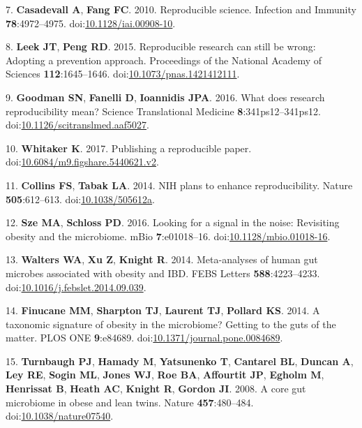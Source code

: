 \documentclass[]{article}
\begin{document}
\hypertarget{ref-Casadevall2010}{}
7. \textbf{Casadevall A}, \textbf{Fang FC}. 2010. Reproducible science.
Infection and Immunity \textbf{78}:4972--4975.
doi:\href{https://doi.org/10.1128/iai.00908-10}{10.1128/iai.00908-10}.

\hypertarget{ref-Leek2015}{}
8. \textbf{Leek JT}, \textbf{Peng RD}. 2015. Reproducible research can
still be wrong: Adopting a prevention approach. Proceedings of the
National Academy of Sciences \textbf{112}:1645--1646.
doi:\href{https://doi.org/10.1073/pnas.1421412111}{10.1073/pnas.1421412111}.

\hypertarget{ref-Goodman2016}{}
9. \textbf{Goodman SN}, \textbf{Fanelli D}, \textbf{Ioannidis JPA}.
2016. What does research reproducibility mean? Science Translational
Medicine \textbf{8}:341ps12--341ps12.
doi:\href{https://doi.org/10.1126/scitranslmed.aaf5027}{10.1126/scitranslmed.aaf5027}.

\hypertarget{ref-Whitaker2017}{}
10. \textbf{Whitaker K}. 2017. Publishing a reproducible paper.
doi:\href{https://doi.org/10.6084/m9.figshare.5440621.v2}{10.6084/m9.figshare.5440621.v2}.

\hypertarget{ref-Collins2014}{}
11. \textbf{Collins FS}, \textbf{Tabak LA}. 2014. NIH plans to enhance
reproducibility. Nature \textbf{505}:612--613.
doi:\href{https://doi.org/10.1038/505612a}{10.1038/505612a}.

\hypertarget{ref-Sze2016}{}
12. \textbf{Sze MA}, \textbf{Schloss PD}. 2016. Looking for a signal in
the noise: Revisiting obesity and the microbiome. mBio
\textbf{7}:e01018--16.
doi:\href{https://doi.org/10.1128/mbio.01018-16}{10.1128/mbio.01018-16}.

\hypertarget{ref-Walters2014}{}
13. \textbf{Walters WA}, \textbf{Xu Z}, \textbf{Knight R}. 2014.
Meta-analyses of human gut microbes associated with obesity and IBD.
FEBS Letters \textbf{588}:4223--4233.
doi:\href{https://doi.org/10.1016/j.febslet.2014.09.039}{10.1016/j.febslet.2014.09.039}.

\hypertarget{ref-Finucane2014}{}
14. \textbf{Finucane MM}, \textbf{Sharpton TJ}, \textbf{Laurent TJ},
\textbf{Pollard KS}. 2014. A taxonomic signature of obesity in the
microbiome? Getting to the guts of the matter. PLOS ONE
\textbf{9}:e84689.
doi:\href{https://doi.org/10.1371/journal.pone.0084689}{10.1371/journal.pone.0084689}.

\hypertarget{ref-Turnbaugh2008}{}
15. \textbf{Turnbaugh PJ}, \textbf{Hamady M}, \textbf{Yatsunenko T},
\textbf{Cantarel BL}, \textbf{Duncan A}, \textbf{Ley RE}, \textbf{Sogin
ML}, \textbf{Jones WJ}, \textbf{Roe BA}, \textbf{Affourtit JP},
\textbf{Egholm M}, \textbf{Henrissat B}, \textbf{Heath AC},
\textbf{Knight R}, \textbf{Gordon JI}. 2008. A core gut microbiome in
obese and lean twins. Nature \textbf{457}:480--484.
doi:\href{https://doi.org/10.1038/nature07540}{10.1038/nature07540}.
\end{document}
